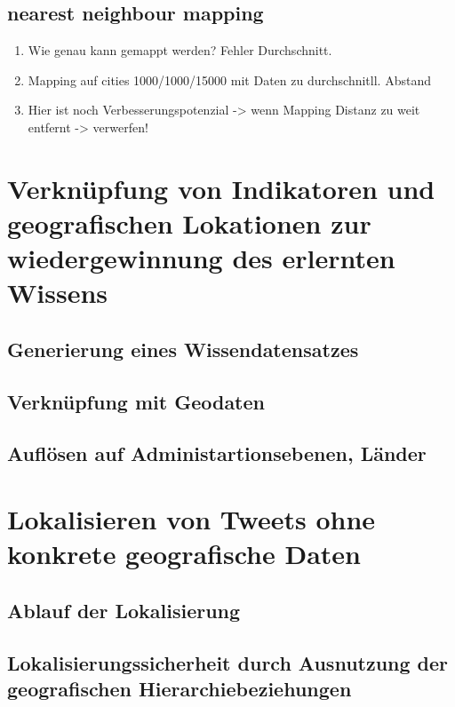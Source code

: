 	\subsection{nearest neighbour mapping}
		\begin{enumerate}
			\item {} Wie genau kann gemappt werden? Fehler Durchschnitt. 
			\item Mapping auf cities 1000/1000/15000 mit Daten zu durchschnitll. Abstand
			\item Hier ist noch Verbesserungspotenzial -> wenn Mapping Distanz zu weit entfernt -> verwerfen! 
		\end{enumerate} 

\section{Verknüpfung von Indikatoren und geografischen Lokationen zur wiedergewinnung des erlernten Wissens}
	
	\subsection{Generierung eines Wissendatensatzes}

	\subsection{Verknüpfung mit Geodaten}

	\subsection{Auflösen auf Administartionsebenen, Länder}

\section{Lokalisieren von Tweets ohne konkrete geografische Daten}
	
	\subsection{Ablauf der Lokalisierung}
	
	\subsection{Lokalisierungssicherheit durch Ausnutzung der geografischen Hierarchiebeziehungen}


